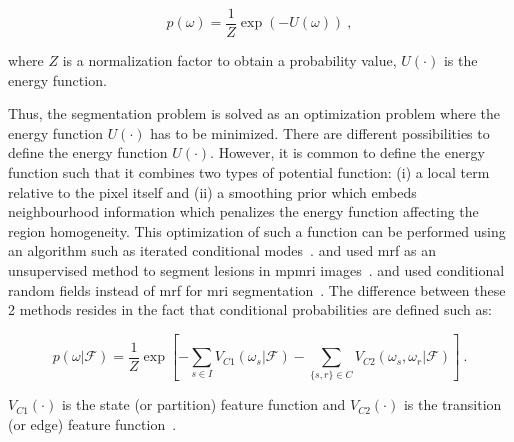 \begin{equation}
	p(\omega) =  \frac{1}{Z} \exp\left( -U(\omega) \right)  \ ,
	\label{eq:mrf2}
\end{equation}

\noindent where $Z$ is a normalization factor to obtain a probability value, $U(\cdot)$ is the energy function.

Thus, the segmentation problem is solved as an optimization problem where the energy function $U(\cdot)$ has to be minimized.
There are different possibilities to define the energy function $U(\cdot)$.
However, it is common to define the energy function such that it combines two types of potential function: (i) a local term relative to the pixel itself and (ii) a smoothing prior which embeds neighbourhood information which penalizes the energy function affecting the region homogeneity.
This optimization of such a function can be performed using an algorithm such as iterated conditional modes~\cite{Kato2001}.
\citeauthor{Liu2009} and \citeauthor{Ozer2010} used \ac{mrf} as an unsupervised method to segment lesions in \ac{mpmri} images~\cite{Liu2009,Ozer2010}.
\citeauthor{Artan2010} and \citeauthor{chung2015prostate} used conditional random fields instead of \ac{mrf} for \ac{mri} segmentation~\cite{Artan2009,Artan2010,chung2015prostate}.
The difference between these 2 methods resides in the fact that conditional probabilities are defined such as:

\begin{equation}
	p(\omega|\mathcal{F}) =  \frac{1}{Z} \exp \left[ - \sum_{s \in I} V_{C1}(\omega_s|\mathcal{F}) - \sum_{\{s,r\} \in C } V_{C2} (\omega_s,\omega_r|\mathcal{F})  \right] \ .
\label{eq:crf}
\end{equation}

\noindent $V_{C1}(\cdot)$ is the state (or partition) feature function and $V_{C2}(\cdot)$ is the transition (or edge) feature function~\cite{Kato2012}.


